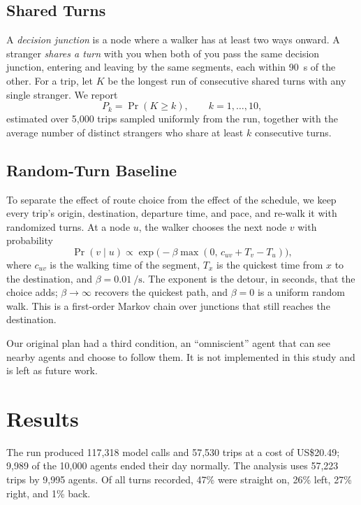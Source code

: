 \documentclass[9pt]{ieeeconf}
\begin{document}
\subsection{Shared Turns}
\label{sec:shared}
A \emph{decision junction} is a node where a walker has at least two ways onward. A stranger \emph{shares a turn} with you when both of you pass the same decision junction, entering and leaving by the same segments, each within \SI{90}{\second} of the other. For a trip, let $K$ be the longest run of consecutive shared turns with any single stranger. We report
\begin{equation}
    P_k = \Pr(K \ge k), \qquad k = 1,\dots,10,
    \label{eq:pk}
\end{equation}
estimated over 5,000 trips sampled uniformly from the run, together with the average number of distinct strangers who share at least $k$ consecutive turns.

\subsection{Random-Turn Baseline}
\label{sec:baseline}
To separate the effect of route choice from the effect of the schedule, we keep every trip's origin, destination, departure time, and pace, and re-walk it with randomized turns. At a node $u$, the walker chooses the next node $v$ with probability
\begin{equation}
    \Pr(v \mid u) \propto \exp\bigl(-\beta \max(0,\, c_{uv} + T_v - T_u)\bigr),
    \label{eq:softmax}
\end{equation}
where $c_{uv}$ is the walking time of the segment, $T_x$ is the quickest time from $x$ to the destination, and $\beta = \SI{0.01}{\per\second}$. The exponent is the detour, in seconds, that the choice adds; $\beta \to \infty$ recovers the quickest path, and $\beta = 0$ is a uniform random walk. This is a first-order Markov chain over junctions that still reaches the destination.

Our original plan had a third condition, an ``omniscient'' agent that can see nearby agents and choose to follow them. It is not implemented in this study and is left as future work.

\section{Results}
\label{sec:results}
The run produced 117,318 model calls and 57,530 trips at a cost of US\$20.49; 9,989 of the 10,000 agents ended their day normally. The analysis uses 57,223 trips by 9,995 agents. Of all turns recorded, 47\% were straight on, 26\% left, 27\% right, and 1\% back.
\end{document}

